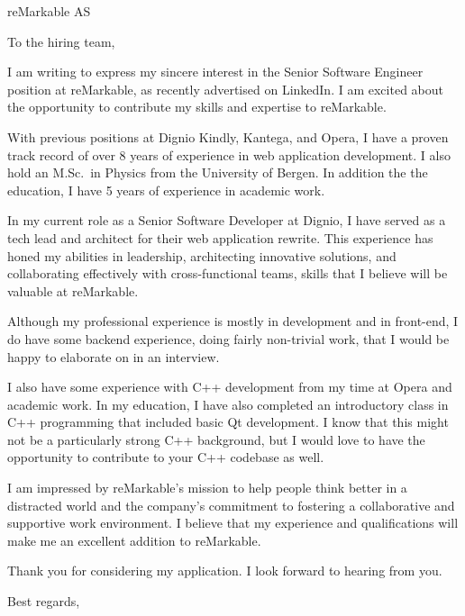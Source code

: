 \documentclass{letter}
\begin{document}
\begin{letter}{reMarkable AS}
  \opening{To the hiring team,}

  I am writing to express my sincere interest in the Senior Software Engineer
  position at reMarkable, as recently advertised on LinkedIn. I  am excited
  about
  the opportunity to contribute my skills and expertise to reMarkable.

  With previous positions at Dignio Kindly, Kantega, and Opera, I have a
  proven track record of over 8 years of experience in web application
  development.	I also hold an M.Sc.\ in Physics from the University of Bergen.
  In addition the the education, I have 5 years of experience in academic work.

  In my current role as a Senior Software Developer at Dignio, I have served
  as a tech lead and architect for their web application rewrite.
  This experience has honed my abilities in leadership, architecting innovative
  solutions,
  and collaborating effectively with cross-functional teams, skills that I
  believe will be valuable at reMarkable.

  Although my professional experience is mostly in development and in
  front-end, I do have some backend experience, doing fairly non-trivial work,
  that I would be happy to elaborate on in an interview.

  I also have some experience with C++ development from my time at Opera and
  academic work. In my education, I have also completed an introductory
  class in C++ programming that included basic Qt development. I know that this
  might not be a particularly strong  C++ background, but I would love to have
  the opportunity to contribute to your C++ codebase as well.

  I am impressed by reMarkable's mission to help people think better in a
  distracted world and the company's commitment to fostering a collaborative
  and
  supportive work environment. I believe that my experience and qualifications
  will make me an excellent addition to reMarkable.

  Thank you for considering my application. I look forward to hearing from you.

  \closing{Best regards,}
\end{letter}
\end{document}
